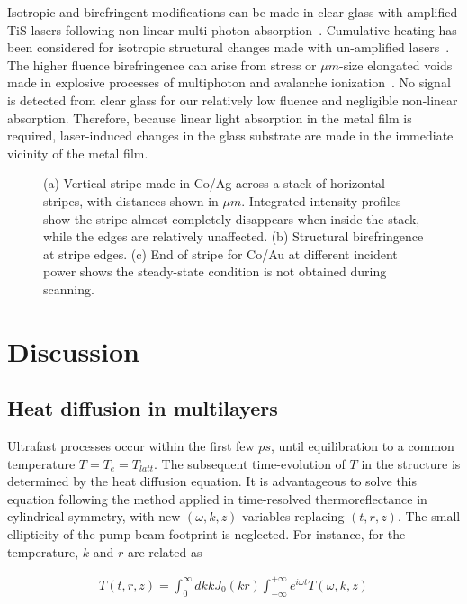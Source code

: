 \documentclass[5p]{elsarticle}
\begin{document}
Isotropic and birefringent modifications can be made in clear glass with amplified TiS lasers following non-linear multi-photon absorption~\cite{2001Sudrie}. Cumulative heating has been considered for isotropic structural changes made with un-amplified lasers~\cite{2001Schaffer,2003Schaffer}. The higher fluence birefringence can arise from stress or $\mu m$-size elongated voids made in explosive processes of multiphoton and avalanche ionization~\cite{2005Hnatovsky,2009Cheng}. No signal is detected from clear glass for our relatively low fluence and negligible non-linear absorption. Therefore, because linear light absorption in the metal film is required, laser-induced changes in the glass substrate are made in the immediate vicinity of the metal film.

\begin{figure}
\centering{}
\caption{\label{fig:Figure1} (a) Vertical stripe made in Co/Ag across a stack of horizontal stripes, with distances shown in $\mu m$. Integrated intensity profiles show the stripe almost completely disappears when inside the stack, while the edges are relatively unaffected. (b) Structural birefringence at stripe edges. (c) End of stripe for Co/Au at different incident power shows the steady-state condition is not obtained during scanning.}
\end{figure}

\section{Discussion}

\subsection{Heat diffusion in multilayers}

Ultrafast processes occur within the first few $ps$, until equilibration to a common temperature $T=T_{e}=T_{latt}$. The subsequent time-evolution of $T$ in the structure is determined by the heat diffusion equation. It is advantageous to solve this equation following the method applied in time-resolved thermoreflectance in cylindrical symmetry, with new $(\omega, k, z)$ variables replacing $(t,r,z)$. The small ellipticity of the pump beam footprint is neglected. For instance, for the temperature, $k$ and $r$ are related as

\begin{eqnarray}
T(t,r,z)=\int_{0}^{\infty}dk k J_{0}(kr)\int_{-\infty}^{+\infty} e^{i\omega t}T(\omega,k,z)
\end{eqnarray}
\end{document}
